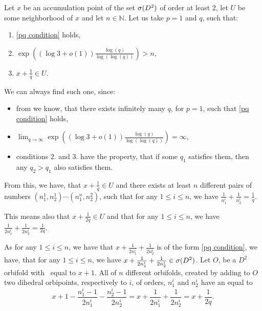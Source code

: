 Let $x$ be an accumulation point of the set ${{\sigma}(D^2)}$ of order at least $2$, let $U$ be 
some neighborhood of $x$ and let $n \in \mathbb{N}$. Let us take $p = 1$ and $q$, such that:
\begin{enumerate} \label{choice for q}
\item \ref{pq condition} holds, 
\item$\exp\left((\log{3}+o(1))\frac{\log(q)}{\log(\log(q))}\right) > n$,
\item $x + \frac{1}{q} \in U$. 
\end{enumerate}
We can always find such one, since:
\begin{itemize} 
\item from \cite{Browning2011} we know, that there exists 
infinitely many $q$, for $p = 1$, such that \ref{pq condition} holds, 
\item
$\lim_{q \to \infty }\exp\left((\log{3}+o(1))\frac{\log(q)}{\log(\log(q))}\right) = \infty$,
\item conditions 2. and 3. have the property, that if some $q_1$ satisfies them, 
then any $q_2 > q_1$ also satisfies them. 
\end{itemize}
From this, we have, that $x + \frac{1}{q} \in U$ and there exists at least $n$ different pairs of numbers $(n_1^1, n_2^1)\cdots (n_1^n, n_2^2)$, such that for any $1 \leq i \leq n$, we have 
$\frac{1}{n_1^i}+\frac{1}{n_2^i} = \frac{1}{q}$. 

This means also that $x + \frac{1}{2q} \in U$ and that for any $1 \leq i \leq n$, we have 
$\frac{1}{2n_1^i}+\frac{1}{2n_2^i} = \frac{1}{2q}$. 

As for any $1 \leq i \leq n$, we have that  $x + \frac{1}{2n_1^i}+\frac{1}{2n_2^i}$ 
is of the form \ref{pq condition}, we have, that for any $1 \leq i \leq n$, we have 
$x + \frac{1}{2n_1^i}+\frac{1}{2n_2^i} \in {{\sigma}(D^2)}$. 
Let $O$, be a $D^2$ orbifold with 
\Eoc\ equal to $x+1$. All of $n$ different orbifolds, created by adding to $O$ two dihedral 
orbipoints, respectively to $i$, of orders, $n_1^i$ and $n_2^i$ have an \Eoc equal to 
\begin{equation}
x + 1 - \frac{n_1^i-1}{2n_1^i} - \frac{n_2^i-1}{2n_2^i} = 
x + \frac{1}{2n_1^i} + \frac{1}{2n_2^i} = x + \frac{1}{2q}.
\end{equation} 

